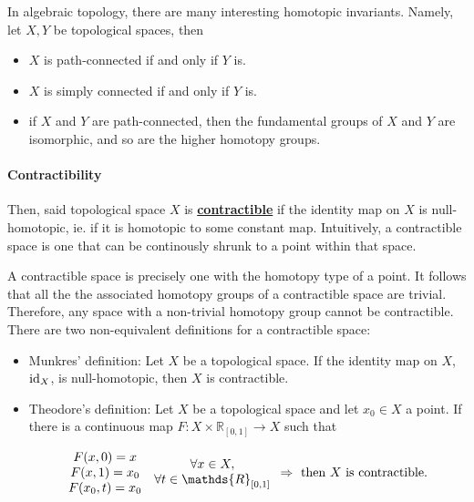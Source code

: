 \documentclass{homework}
\begin{document}
In algebraic topology, there are many interesting homotopic invariants. Namely, let $X, Y$ be topological spaces, then 

\begin{itemize}
    \item $X$ is path-connected if and only if $Y$ is.
    \item $X$ is simply connected if and only if $Y$ is.
    \item if $X$ and $Y$ are path-connected, then the fundamental groups of $X$ and $Y$ are isomorphic, and so are the higher homotopy groups. \\
\end{itemize}

\paragraph{\textbf{Contractibility}}

 Then, said topological space $X$ is \underline{\textbf{contractible}} if the identity map on $X$ is null-homotopic, ie. if it is homotopic to some constant map. Intuitively, a contractible space is one that can be continously shrunk to a point within that space.

A contractible space is precisely one with the homotopy type of a point. It follows that all the the associated homotopy groups of a contractible space are trivial. Therefore, any space with a non-trivial homotopy group cannot be contractible. There are two non-equivalent definitions for a contractible space:

\begin{itemize}
    \item Munkres' definition: Let $X$ be a topological space. If the identity map on $X$, $\textnormal{id}_X$, is null-homotopic, then $X$ is contractible. 
    \item Theodore's definition: Let $X$ be a topological space and let $x_0 \in X$ a point. If there is a continuous map $F: X \times \mathds{R}_{[0,1]} \rightarrow X$ such that 
    
    \begin{align}
    \begin{array}{c}
         F(x, 0) = x \\
         F(x, 1) = x_0 \\
         F(x_0, t) = x_0  
    \end{array} \begin{array}{c}
        \forall x \in X, \\
        \forall t \in \mathds{R}_{[0,1]}
    \end{array} 
    \Rightarrow \textnormal{ then $X$ is contractible. }
    \end{align}
\end{itemize}
\end{document}
